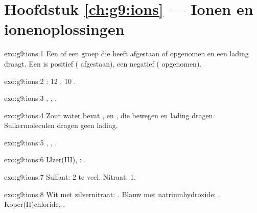 \section*{Hoofdstuk \ref{ch:g9:ions} --- Ionen en ionenoplossingen}

\begin{solution}{exo:g9:ions:1}
Een  of een groep  die  heeft afgestaan of
opgenomen en een lading draagt. Een  is positief (
afgestaan), een  negatief ( opgenomen).
\end{solution}

\begin{solution}{exo:g9:ions:2}
: 12 , 10 .
\end{solution}

\begin{solution}{exo:g9:ions:3}
, , .
\end{solution}

\begin{solution}{exo:g9:ions:4}
Zout water bevat ,  en , die bewegen en
lading dragen. Suikermoleculen dragen geen lading.
\end{solution}

\begin{solution}{exo:g9:ions:5}
, , .
\end{solution}

\begin{solution}{exo:g9:ions:6}
IJzer(III), : .
\end{solution}

\begin{solution}{exo:g9:ions:7}
Sulfaat: 2  te veel. Nitraat: 1.
\end{solution}

\begin{solution}{exo:g9:ions:8}
Wit met zilvernitraat: . Blauw met natriumhydroxide:
. Koper(II)chloride, .
\end{solution}

